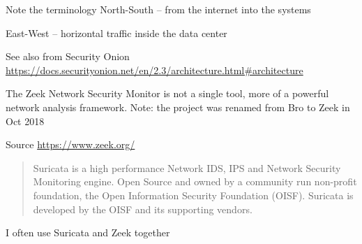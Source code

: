\documentclass[Screen16to9,17pt]{foils}
\begin{document}
\begin{list2}
\item Note the terminology North-South -- from the internet into the systems
\item East-West -- horizontal traffic inside the data center
\item See also from Security Onion \url{https://docs.securityonion.net/en/2.3/architecture.html#architecture}
\end{list2}





The Zeek Network Security Monitor is not a single tool, more of a
powerful network analysis framework. Note: the project was renamed from Bro to Zeek in Oct 2018

{\small Source \url{https://www.zeek.org/}}




\begin{quote}
Suricata is a high performance Network IDS, IPS and Network Security Monitoring engine. Open Source and owned by a community run non-profit foundation, the Open Information Security Foundation (OISF). Suricata is developed by the OISF and its supporting vendors.
\end{quote}


\centerline{I often use Suricata and Zeek together}
\end{document}
